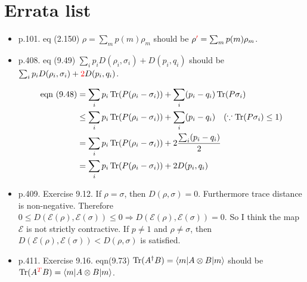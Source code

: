 \section{Errata list}\label{errata}

\begin{itemize}
    \item p.101. eq (2.150) $\rho = \sum_m p(m) \rho_m$ should be $\rho \textcolor{red}{'} = \sum_m p(m) \rho_m$.
%
    \item p.408. eq (9.49) $\sum_i p_i D(\rho_i, \sigma_i) + D(p_i, q_i)$ should be $\sum_i p_i D(\rho_i, \sigma_i) + \textcolor[rgb]{1,0,0}{2}D(p_i, q_i)$.

    \begin{align*}
    \text{eqn } (9.48) &= \sum_i p_i \operatorname{Tr} (P(\rho_i - \sigma_i)) + \sum_i (p_i - q_i) \operatorname{Tr} (P \sigma_i)\\
    &\leq \sum_i p_i \operatorname{Tr} (P(\rho_i - \sigma_i)) + \sum_i (p_i - q_i)~~~(\because \operatorname{Tr} (P \sigma_i) \leq 1)\\
    &= \sum_i p_i \operatorname{Tr} (P(\rho_i - \sigma_i)) + 2 \frac{\sum_i (p_i - q_i)}{2}\\
    &= \sum_i p_i \operatorname{Tr} (P(\rho_i - \sigma_i)) + 2D(p_i, q_i)
    \end{align*}
%
    \item p.409. Exercise 9.12. If $\rho = \sigma$, then $D(\rho, \sigma) = 0$. Furthermore trace distance is non-negative. Therefore $0 \leq D(\mathcal{E}(\rho), \mathcal{E}(\sigma)) \leq 0 \Rightarrow D(\mathcal{E}(\rho), \mathcal{E}(\sigma))  = 0$. So I think the map $\mathcal{E}$ is not strictly contractive. If $p \neq 1$ and $\rho \neq \sigma$, then $D(\mathcal{E}(\rho), \mathcal{E}(\sigma)) < D(\rho, \sigma)$ is satisfied.
%
    \item p.411. Exercise 9.16. eqn(9.73) $\operatorname{Tr} (A^\dagger B) = \braket{m | A \otimes B | m}$ should be $\operatorname{Tr} (A^{\textcolor{red}{T}} B) = \braket{m | A \otimes B | m}$.


\end{itemize}
